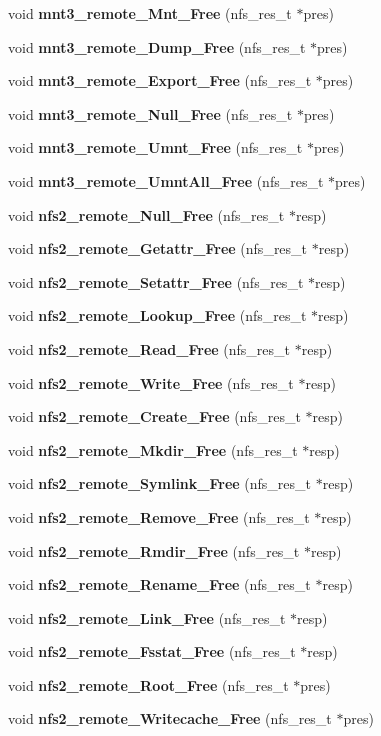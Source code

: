 \begin{CompactItemize}
void {\bf mnt3\_\-remote\_\-Mnt\_\-Free} (nfs\_\-res\_\-t $\ast$pres)
\item 
void {\bf mnt3\_\-remote\_\-Dump\_\-Free} (nfs\_\-res\_\-t $\ast$pres)
\item 
void {\bf mnt3\_\-remote\_\-Export\_\-Free} (nfs\_\-res\_\-t $\ast$pres)
\item 
void {\bf mnt3\_\-remote\_\-Null\_\-Free} (nfs\_\-res\_\-t $\ast$pres)
\item 
void {\bf mnt3\_\-remote\_\-Umnt\_\-Free} (nfs\_\-res\_\-t $\ast$pres)
\item 
void {\bf mnt3\_\-remote\_\-Umnt\-All\_\-Free} (nfs\_\-res\_\-t $\ast$pres)
\item 
void {\bf nfs2\_\-remote\_\-Null\_\-Free} (nfs\_\-res\_\-t $\ast$resp)
\item 
void {\bf nfs2\_\-remote\_\-Getattr\_\-Free} (nfs\_\-res\_\-t $\ast$resp)
\item 
void {\bf nfs2\_\-remote\_\-Setattr\_\-Free} (nfs\_\-res\_\-t $\ast$resp)
\item 
void {\bf nfs2\_\-remote\_\-Lookup\_\-Free} (nfs\_\-res\_\-t $\ast$resp)
\item 
void {\bf nfs2\_\-remote\_\-Read\_\-Free} (nfs\_\-res\_\-t $\ast$resp)
\item 
void {\bf nfs2\_\-remote\_\-Write\_\-Free} (nfs\_\-res\_\-t $\ast$resp)
\item 
void {\bf nfs2\_\-remote\_\-Create\_\-Free} (nfs\_\-res\_\-t $\ast$resp)
\item 
void {\bf nfs2\_\-remote\_\-Mkdir\_\-Free} (nfs\_\-res\_\-t $\ast$resp)
\item 
void {\bf nfs2\_\-remote\_\-Symlink\_\-Free} (nfs\_\-res\_\-t $\ast$resp)
\item 
void {\bf nfs2\_\-remote\_\-Remove\_\-Free} (nfs\_\-res\_\-t $\ast$resp)
\item 
void {\bf nfs2\_\-remote\_\-Rmdir\_\-Free} (nfs\_\-res\_\-t $\ast$resp)
\item 
void {\bf nfs2\_\-remote\_\-Rename\_\-Free} (nfs\_\-res\_\-t $\ast$resp)
\item 
void {\bf nfs2\_\-remote\_\-Link\_\-Free} (nfs\_\-res\_\-t $\ast$resp)
\item 
void {\bf nfs2\_\-remote\_\-Fsstat\_\-Free} (nfs\_\-res\_\-t $\ast$resp)
\item 
void {\bf nfs2\_\-remote\_\-Root\_\-Free} (nfs\_\-res\_\-t $\ast$pres)
\item 
void {\bf nfs2\_\-remote\_\-Writecache\_\-Free} (nfs\_\-res\_\-t $\ast$pres)
\item 

\end{CompactItemize}
